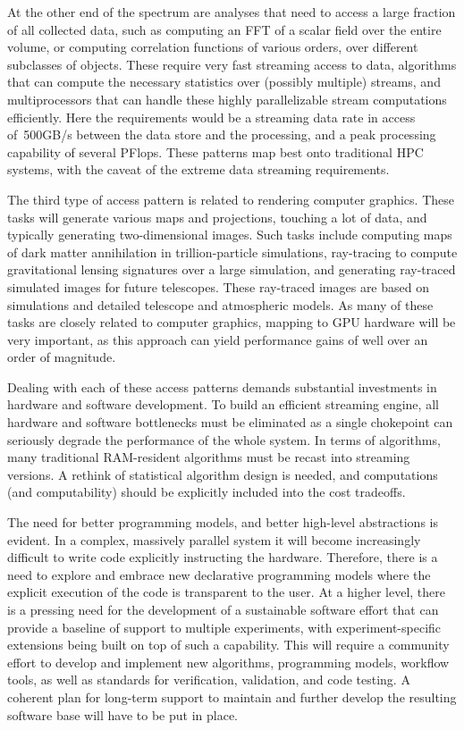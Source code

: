 At the other end of the spectrum are analyses that need to access a
large fraction of all collected data, such as computing an FFT of a
scalar field over the entire volume, or computing correlation
functions of various orders, over different subclasses of
objects. These require very fast streaming access to data, algorithms
that can compute the necessary statistics over (possibly multiple)
streams, and multiprocessors that can handle these highly
parallelizable stream computations efficiently. Here the requirements
would be a streaming data rate in access of~500GB/s between the data
store and the processing, and a peak processing capability of several
PFlops. These patterns map best onto traditional HPC systems, with the
caveat of the extreme data streaming requirements.

The third type of access pattern is related to rendering computer
graphics. These tasks will generate various maps and projections,
touching a lot of data, and typically generating two-dimensional
images. Such tasks include computing maps of dark matter annihilation
in trillion-particle simulations, ray-tracing to compute gravitational
lensing signatures over a large simulation, and generating ray-traced
simulated images for future telescopes. These ray-traced images are
based on simulations and detailed telescope and atmospheric models. As
many of these tasks are closely related to computer graphics, mapping
to GPU hardware will be very important, as this approach can yield
performance gains of well over an order of magnitude.

Dealing with each of these access patterns demands substantial
investments in hardware and software development. To build an
efficient streaming engine, all hardware and software bottlenecks must
be eliminated as a single chokepoint can seriously degrade the
performance of the whole system. In terms of algorithms, many
traditional RAM-resident algorithms must be recast into streaming
versions. A rethink of statistical algorithm design is needed, and
computations (and computability) should be explicitly included into
the cost tradeoffs.

The need for better programming models, and better high-level
abstractions is evident. In a complex, massively parallel system it
will become increasingly difficult to write code explicitly
instructing the hardware. Therefore, there is a need to explore and
embrace new declarative programming models where the explicit
execution of the code is transparent to the user. At a higher level,
there is a pressing need for the development of a sustainable software
effort that can provide a baseline of support to multiple experiments,
with experiment-specific extensions being built on top of such a
capability. This will require a community effort to develop and
implement new algorithms, programming models, workflow tools, as well
as standards for verification, validation, and code testing. A
coherent plan for long-term support to maintain and further develop
the resulting software base will have to be put in place.

